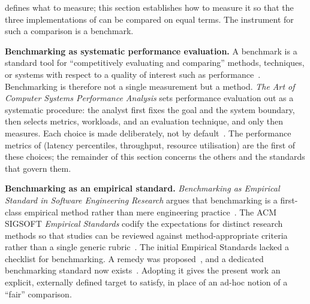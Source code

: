  defines what to measure; this section establishes how to measure it so that the three implementations of  can be compared on equal terms. The instrument for such a comparison is a benchmark.

\textbf{Benchmarking as systematic performance evaluation.} A benchmark is a standard tool for ``competitively evaluating and comparing'' methods, techniques, or systems with respect to a quality of interest such as performance~\citep{empiricalStandardsBenchmarking}. Benchmarking is therefore not a single measurement but a method. \emph{The Art of Computer Systems Performance Analysis} sets performance evaluation out as a systematic procedure: the analyst first fixes the goal and the system boundary, then selects metrics, workloads, and an evaluation technique, and only then measures. Each choice is made deliberately, not by default~\citep{jain1991art}. The performance metrics of  (latency percentiles, throughput, resource utilisation) are the first of these choices; the remainder of this section concerns the others and the standards that govern them.

\textbf{Benchmarking as an empirical standard.} \emph{Benchmarking as Empirical Standard in Software Engineering Research} argues that benchmarking is a first-class empirical method rather than mere engineering practice~\citep{hasselbring2021benchmarking}. The ACM SIGSOFT \emph{Empirical Standards} codify the expectations for distinct research methods so that studies can be reviewed against method-appropriate criteria rather than a single generic rubric~\citep{Ralph2020}. The initial Empirical Standards lacked a checklist for benchmarking. A remedy was proposed~\citep{hasselbring2021benchmarking}, and a dedicated benchmarking standard now exists~\citep{empiricalStandardsBenchmarking}. Adopting it gives the present work an explicit, externally defined target to satisfy, in place of an ad-hoc notion of a ``fair'' comparison.

